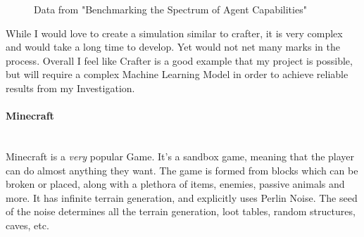 \begin{flushleft}
                        \begin{figure}[h]
                            \centering
                            \qquad
                            \caption*{Data from "Benchmarking the Spectrum of Agent Capabilities"}
                        \end{figure}

                        While I would love to create a simulation similar to crafter, it is very complex and would take a long time to develop. Yet
                        would not net many marks in the process. Overall I feel like Crafter is a good example that my project is possible, but will
                        require a complex Machine Learning Model in order to achieve reliable results from my Investigation.

                \paragraph{Minecraft} \mbox{} \\
                    \vspace{0.2cm}
                    Minecraft is a \textit{very} popular Game. It's a sandbox game, meaning that the player can do almost anything they want.
                    The game is formed from blocks which can be broken or placed, along with a plethora of items, enemies, passive animals
                    and more. It has infinite terrain generation, and explicitly uses Perlin Noise. The seed of the noise determines
                    all the terrain generation, loot tables, random structures, caves, etc. \\
                    

\end{flushleft}
